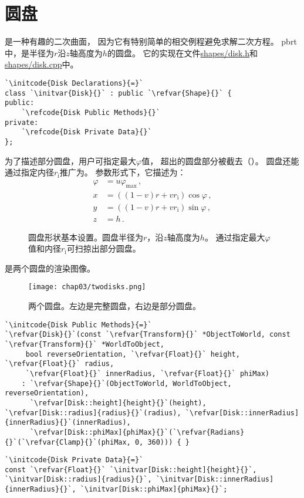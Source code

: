 \section{圆盘}\label{sec:圆盘}

是一种有趣的二次曲面，
因为它有特别简单的相交例程避免求解二次方程。
pbrt中，是半径为$r$沿$z$轴高度为$h$的圆盘。
它的实现在文件\href{https://github.com/mmp/pbrt-v3/tree/master/src/shapes/disk.h}{\ttfamily shapes/disk.h}和
\href{https://github.com/mmp/pbrt-v3/tree/master/src/shapes/disk.cpp}{\ttfamily shapes/disk.cpp}中。
\begin{lstlisting}
`\initcode{Disk Declarations}{=}`
class `\initvar{Disk}{}` : public `\refvar{Shape}{}` {
public:
    `\refcode{Disk Public Methods}{}`
private:
    `\refcode{Disk Private Data}{}`
};
\end{lstlisting}

为了描述部分圆盘，用户可指定最大$\varphi$值，
超出的圆盘部分被截去（）。
圆盘还能通过指定内径$r_{\mathrm{i}}$推广为。
参数形式下，它描述为：
\begin{align*}
    \varphi & =u\varphi_{\max}\, ,                     \\
    x       & =((1-v)r+vr_{\mathrm{i}})\cos\varphi\, , \\
    y       & =((1-v)r+vr_{\mathrm{i}})\sin\varphi\, , \\
    z       & =h\, .
\end{align*}
\begin{figure}[htbp]
    \centering
    \caption{圆盘形状基本设置。圆盘半径为$r$，沿$z$轴高度为$h$。
        通过指定最大$\varphi$值和内径$r_{\mathrm{i}}$可扫掠出部分圆盘。}
    \label{fig:3.8}
\end{figure}

是两个圆盘的渲染图像。
\begin{figure}[htbp]
    \centering\texttt{[image: chap03/twodisks.png]}
    \caption{两个圆盘。左边是完整圆盘，右边是部分圆盘。}
    \label{fig:3.9}
\end{figure}
\begin{lstlisting}
`\initcode{Disk Public Methods}{=}`
`\refvar{Disk}{}`(const `\refvar{Transform}{}` *ObjectToWorld, const `\refvar{Transform}{}` *WorldToObject,
     bool reverseOrientation, `\refvar{Float}{}` height, `\refvar{Float}{}` radius,
     `\refvar{Float}{}` innerRadius, `\refvar{Float}{}` phiMax)
    : `\refvar{Shape}{}`(ObjectToWorld, WorldToObject, reverseOrientation),
      `\refvar[Disk::height]{height}{}`(height), `\refvar[Disk::radius]{radius}{}`(radius), `\refvar[Disk::innerRadius]{innerRadius}{}`(innerRadius),
      `\refvar[Disk::phiMax]{phiMax}{}`(`\refvar{Radians}{}`(`\refvar{Clamp}{}`(phiMax, 0, 360))) { }
\end{lstlisting}
\begin{lstlisting}
`\initcode{Disk Private Data}{=}`
const `\refvar{Float}{}` `\initvar[Disk::height]{height}{}`, `\initvar[Disk::radius]{radius}{}`, `\initvar[Disk::innerRadius]{innerRadius}{}`, `\initvar[Disk::phiMax]{phiMax}{}`;
\end{lstlisting}

